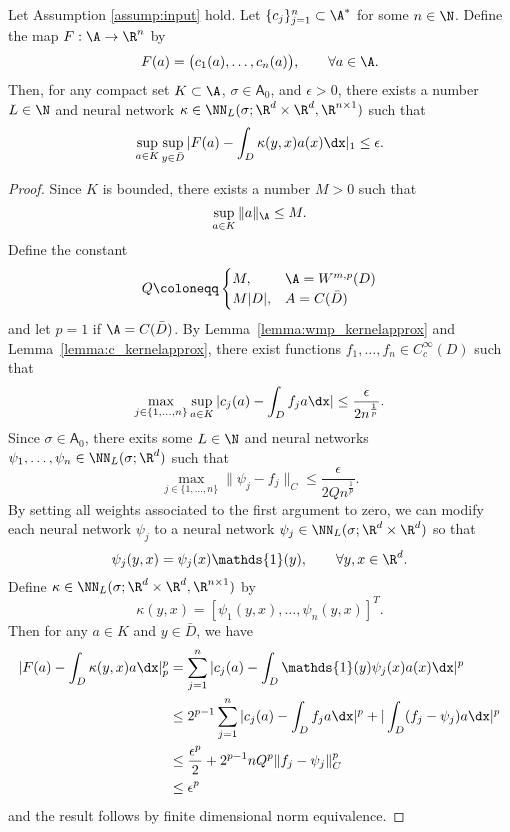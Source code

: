 \begin{lemma}
\label{lemma:input_approx}
Let Assumption \ref{assump:input} hold. Let \(\{c_j\}_{j=1}^n \subset \A^*\) for some \(n \in \N\).
Define the map \(F : \A \to \R^n\) by 
\[F(a) = \bigl (c_1(a), \dots, c_n(a) \bigl ), \qquad \forall a \in \A.\]
Then, for any compact set \(K \subset \A\), \(\sigma \in \mathsf{A}_{0}\), and \(\epsilon > 0\), there exists 
a number \(L \in \N\) and neural network \(\kappa \in \NN_L(\sigma;\R^{d} \times \R^{d},\R^{n \times 1})\) such that
\[\sup_{a \in K} \sup_{y \in \bar{D}} |F(a) - \int_{D} \kappa(y, x) a(x) \dx |_1 \leq \epsilon. \]
\end{lemma}
\begin{proof}
Since \(K\) is bounded, there exists a number \(M > 0\) such that
\[\sup_{a \in K} \|a\|_\A \leq M.\]
Define the constant
\[Q \coloneqq \begin{cases}
M, & \A = W^{m,p}(D) \\
M |D|, & A = C(\bar{D})
\end{cases}\]
and let \(p = 1\) if \(\A = C(\bar{D})\).
By Lemma~\ref{lemma:wmp_kernelapprox} and Lemma~\ref{lemma:c_kernelapprox}, there exist functions
\(f_1,\dots,f_n \in C^\infty_c (D)\) such that
\[\max_{j\in \{1,\dots,n\}} \sup_{a \in K} |c_j(a) - \int_D f_j a \dx | \leq \frac{\epsilon}{2 n^{\frac{1}{p}}}.\]
Since \(\sigma \in \mathsf{A}_0\), there exits some \(L \in \N\) and neural networks \(\psi_1,\dots,\psi_n \in \NN_L(\sigma;\R^d)\)
such that
\[\max_{j \in \{1,\dots,n\}} \|\psi_j - f_j\|_C \leq \frac{\epsilon}{2Q n^{\frac{1}{p}}}.\]
By setting all weights associated to the first argument to zero, 
we can modify each neural network \(\psi_j\)
to a neural network \(\psi_j \in \NN_L(\sigma;\R^{d} \times \R^{d})\) so that
\[\psi_j(y,x) = \psi_j(x) \mathds{1}(y), \qquad \forall y,x \in \R^{d}.\]
Define \(\kappa \in \NN_L (\sigma; \R^{d} \times \R^{d}, \R^{n \times 1})\) by
\[\kappa(y,x) = [\psi_1(y,x), \dots, \psi_n (y,x) ]^T.\]
Then for any \(a \in K\) and \(y \in \bar{D}\), we have
\begin{align*}
|F(a) - \int_D \kappa(y,x) a \dx|_p^p &= \sum_{j=1}^n |c_j(a) - \int_D \mathds{1}(y) \psi_j(x) a(x) \dx|^p \\
&\leq 2^{p-1} \sum_{j=1}^n |c_j(a) - \int_D f_j a \dx|^p + |\int_D (f_j - \psi_j) a \dx |^p \\
&\leq \frac{\epsilon^p}{2} + 2^{p-1} n Q^p \|f_j - \psi_j\|_C^p \\
&\leq \epsilon^p
\end{align*}
and the result follows by finite dimensional norm equivalence.
\end{proof}

